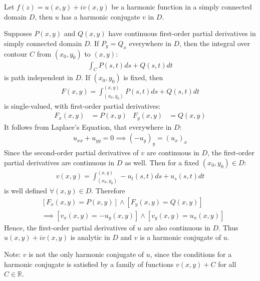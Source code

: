 \documentclass[12pt, english]{book}
\makeatletter
\renewenvironment{proof}[1][\proofname]{\par
	\pushQED{\qed}%
	\normalfont \topsep6\p@\@plus6\p@\relax
	\list{}{%
		\settowidth{\leftmargin}{\itshape\proofname:\hskip\labelsep}%
		\setlength{\labelwidth}{0pt}%
		\setlength{\itemindent}{-\leftmargin}%
		}%
	\item[\hskip\labelsep\itshape#1\@addpunct{:}]\ignorespaces
	}{\popQED\endlist\@endpefalse}
\makeatother
\begin{document}
	\begin{theorem}
		\label{Harmonic Function on Simply Connected Domain always have harmonic conjugate v Theorem - Complex}
		Let \(f(z) = u(x,y) + iv(x,y)\) be a harmonic function in a simply connected domain \(D\), then \(u\) has a harmonic conjugate \(v\) in \(D\).
	\end{theorem}
	\begin{proof}
		Supposes \(P(x,y)\) and \(Q(x,y)\) have continuous first-order partial derivatives in simply connected domain \(D\). If \(P_y = Q_x\) everywhere in \(D\), then the integral over contour \(C\) from \((x_0,y_0)\) to \((x,y)\):
		\begin{align*}
			\int_{C} P(s,t) ds + Q(s,t) dt
		\end{align*}
		is path independent in \(D\). If \((x_0, y_0)\) is fixed, then 
		\begin{align*}
			F(x,y) = \int_{(x_0, y_0)}^{(x,y)} P(s, t) ds + Q(s,t) dt
		\end{align*}
		is single-valued, with first-order partial derivatives:
		\begin{align*}
			F_x(x,y) &= P(x,y) &
			F_y(x,y) &= Q(x,y)
		\end{align*}
		It follows from Laplace's Equation, that everywhere in \(D\):
		\begin{align*}
			u_{xx} + u_{yy} = 0
			\implies (-u_y)_y = (u_x)_x
		\end{align*}
		Since the second-order partial derivatives of \(v\) are continuous in \(D\), the first-order partial derivatives are continuous in \(D\) as well. Then for a fixed \((x_0, y_0) \in D\):
		\begin{align*}
			v(x,y) = \int_{(x_0, y_0)}^{(x,y)} - u_t(s,t) ds + u_s(s,t) dt
		\end{align*}
		is well defined \(\forall (x,y) \in D\). Therefore 
		\begin{align*}
			&[F_x(x,y) = P(x,y)] \land [F_y(x,y) = Q(x,y)] \\
			&\implies [v_x(x,y) = -u_y(x,y)] \land [v_y (x,y) = u_x(x,y)]
		\end{align*}
		Hence, the first-order partial derivatives of \(u\) are also continuous in \(D\). Thus \(u(x,y) + iv(x,y)\) is analytic in \(D\) and \(v\) is a harmonic conjugate of \(u\).
		
		Note: \(v\) is not the only harmonic conjugate of \(u\), since the conditions for a harmonic conjugate is satisfied by a family of functions \(v(x,y) + C\) for all \(C \in \mathbb{R}\).
	\end{proof}
	
\end{document}
